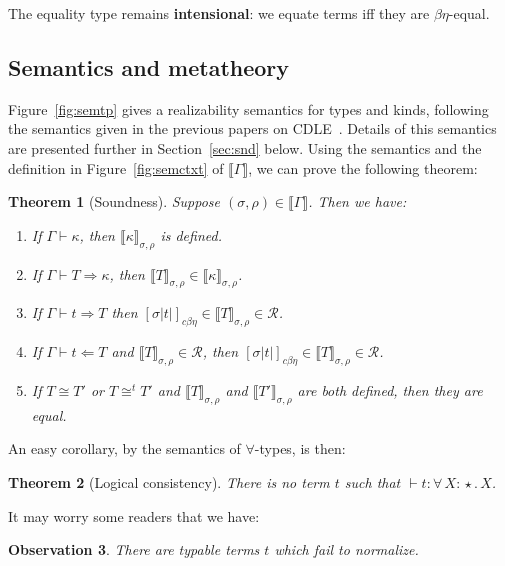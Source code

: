 \documentclass{article}
\newcommand{\abs}[4]{{#1}\, #2\! : \! #3.\, #4}
\newcommand{\interp}[1]{\llbracket #1 \rrbracket}
\newcommand{\tpcheck}[0]{\Leftarrow}
\newcommand{\tpsynth}[0]{\Rightarrow}
\newcommand{\cbe}[0]{c\beta\eta}
\newtheorem{theorem}{Theorem}
\newtheorem{observation}[theorem]{Observation}
\begin{document}
The equality type remains \textbf{intensional}: we equate terms iff they are $\beta\eta$-equal.  

\subsection{Semantics and metatheory}

Figure~\ref{fig:semtp} gives a realizability semantics for types and
kinds, following the semantics given in the previous papers on
CDLE~\cite{stump18,stump17}.  Details of this semantics are presented
further in Section~\ref{sec:snd} below.  Using the semantics and the
definition in Figure~\ref{fig:semctxt} of $\interp{\Gamma}$, we can
prove the following theorem:
\begin{theorem}[Soundness]
\label{thm:snd}
Suppose $(\sigma,\rho)\in\interp{\Gamma}$.  Then we have:
\begin{enumerate}
\item If $\Gamma\vdash \kappa$, then $\interp{\kappa}_{\sigma,\rho}$ is defined.
\item If $\Gamma\vdash T \tpsynth \kappa$, then $\interp{T}_{\sigma,\rho}\in\interp{\kappa}_{\sigma,\rho}$.
\item If $\Gamma\vdash t \tpsynth T$ then $[\sigma |t|]_{\cbe}\in\interp{T}_{\sigma,\rho}\in \mathcal{R}$.
\item If $\Gamma\vdash t \tpcheck T$ and $\interp{T}_{\sigma,\rho}\in \mathcal{R}$, then
    $[\sigma |t|]_{\cbe}\in\interp{T}_{\sigma,\rho}\in \mathcal{R}$.
\item If $T \cong T'$ or $T \cong^t T'$ and $\interp{T}_{\sigma,\rho}$ and $\interp{T'}_{\sigma,\rho}$ are both defined, then they are equal.
\end{enumerate}
\end{theorem}

An easy corollary, by the semantics of $\forall$-types, is then:

\begin{theorem}[Logical consistency]
\label{thm:consis}
  There is no term $t$ such that $\vdash t : \abs{\forall}{X}{\star}{X}$.
\end{theorem}

It may worry some readers that we have:
\begin{observation}
  There are typable terms $t$ which fail to normalize.
\end{observation}
\end{document}
